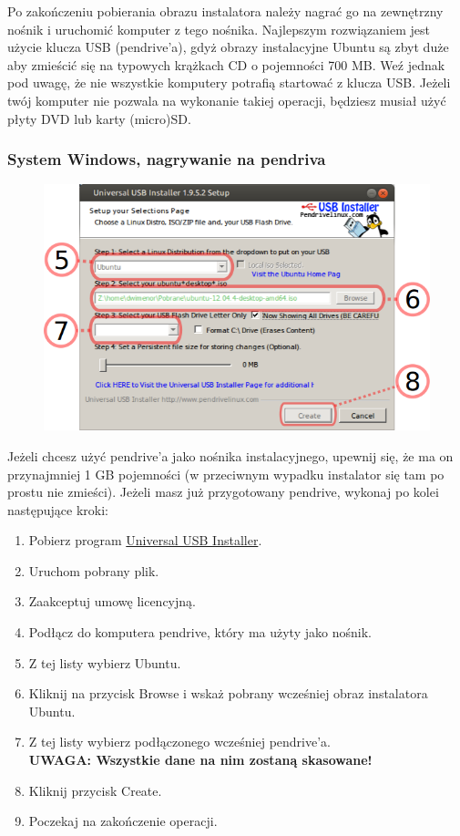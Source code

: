 Po zakończeniu pobierania obrazu instalatora należy nagrać go na zewnętrzny nośnik i uruchomić komputer z tego nośnika. Najlepszym rozwiązaniem jest użycie klucza USB (pendrive'a), gdyż obrazy instalacyjne Ubuntu są zbyt duże aby zmieścić się na typowych krążkach CD o pojemności 700 MB. Weź jednak pod uwagę, że nie wszystkie komputery potrafią startować z klucza USB. Jeżeli twój komputer nie pozwala na wykonanie takiej operacji, będziesz musiał użyć płyty DVD lub karty (micro)SD.
\subsubsection{System Windows, nagrywanie na pendriva}
\begin{figure}
	\vspace{-10pt}
	\includegraphics[width=\linewidth]{images/instalacja_nagrywanie_obrazu.png}
\end{figure}

Jeżeli chcesz użyć pendrive'a jako nośnika instalacyjnego, upewnij się, że ma on przynajmniej 1 GB pojemności (w przeciwnym wypadku instalator się tam po prostu nie zmieści). Jeżeli masz już przygotowany pendrive, wykonaj po kolei następujące kroki:
\begin{enumerate}[label=\protect\circled{\arabic*}]
\item Pobierz program \href{http://www.pendrivelinux.com/downloads/Universal-USB-Installer/Universal-USB-Installer-1.9.5.2.exe}{Universal USB Installer}.
\item Uruchom pobrany plik.
\item Zaakceptuj umowę licencyjną.
\item Podłącz do komputera pendrive, który ma użyty jako nośnik.
\item Z tej listy wybierz Ubuntu.
\item Kliknij na przycisk \textcolor{ubuntu_orange}{Browse} i wskaż pobrany wcześniej obraz instalatora Ubuntu.
\item Z tej listy wybierz podłączonego wcześniej pendrive'a.\\
\textbf{UWAGA: Wszystkie dane na nim zostaną skasowane!}
\item Kliknij przycisk \textcolor{ubuntu_orange}{Create}.
\item Poczekaj na zakończenie operacji.
\end{enumerate}
\clearpage
